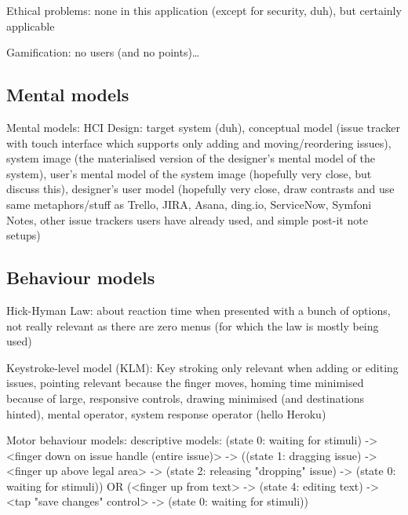 

Ethical problems: none in this application (except for security, duh), but certainly applicable %

Gamification: no users (and no points)\dots %

\subsection{Mental models}

Mental models: HCI Design: target system (duh), conceptual model (issue tracker with touch interface which supports only adding and moving/reordering issues), system image (the materialised version of the designer's mental model of the system), user's mental model of the system image (hopefully very close, but discuss this), designer's user model (hopefully very close, draw contrasts and use same metaphors/stuff as Trello, JIRA, Asana, ding.io, ServiceNow, Symfoni Notes, other issue trackers users have already used, and simple post-it note setups)

\subsection{Behaviour models}

Hick-Hyman Law: about reaction time when presented with a bunch of options, not really relevant as there are zero menus (for which the law is mostly being used)

Keystroke-level model (KLM): Key stroking only relevant when adding or editing issues, pointing relevant because the finger moves, homing time minimised because of large, responsive controls, drawing minimised (and destinations hinted), mental operator, system response operator (hello Heroku) %

Motor behaviour models: descriptive models: (state 0: waiting for stimuli) -> <finger down on issue handle (entire issue)> -> ((state 1: dragging issue) -> <finger up above legal area> -> (state 2: releasing "dropping" issue) -> (state 0: waiting for stimuli)) OR (<finger up from text> -> (state 4: editing text) -> <tap "save changes" control> -> (state 0: waiting for stimuli))

